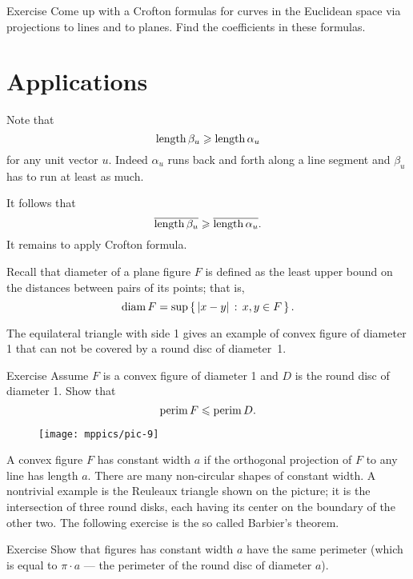 \begin{thm}{Exercise}\label{ex:3d-crofton}
Come up with a Crofton formulas for curves in the Euclidean space via projections to lines and to planes.
Find the coefficients in these formulas.
\end{thm}

\section{Applications}

Note that 
\[\mathop{\rm length}\nolimits \beta_u\geqslant \mathop{\rm length}\nolimits \alpha_u\]
for any unit vector $u$.
Indeed $\alpha_u$ runs back and forth along a line segment and $\beta_u$ has to run at least as much.

It follows that 
\[\overline{\mathop{\rm length}\nolimits \beta_u}\geqslant \overline{\mathop{\rm length}\nolimits \alpha_u}.\]
It remains to apply Crofton formula.
\qeds


Recall that diameter of a plane figure $F$ is defined as the least upper bound on the distances between pairs of its points;
that is,
\[\mathop{\rm diam}\nolimits F=\sup\left\{\,{|x-y|}\,:\,{x,y\in F}\,\right\}.\]

The equilateral triangle with side 1 gives an example of convex figure of diameter 1 that can not be covered by a round disc of diameter~1.

\begin{thm}{Exercise} 
Assume $F$ is a convex figure of diameter 1 and $D$ is the round disc of diameter 1.
Show that
\[\mathop{\rm perim}\nolimits F\leqslant \mathop{\rm perim}\nolimits D.\]
\end{thm}

\begin{wrapfigure}{r}{33 mm}
\vskip-5mm
\centering
\texttt{[image: mppics/pic-9]}
\end{wrapfigure}

A convex figure $F$ has constant width $a$ if the orthogonal projection of $F$ to any line has length $a$.
There are many non-circular shapes of constant width. 
A nontrivial example is the Reuleaux triangle shown on the picture;
it is the intersection of three round disks, each having its center on the boundary of the other two.
The following exercise is the so called Barbier's theorem.

\begin{thm}{Exercise} 
Show that figures has constant width $a$ have the same perimeter (which is equal to $\pi\cdot a$ --- the perimeter of the round disc of diameter $a$).
\end{thm}


